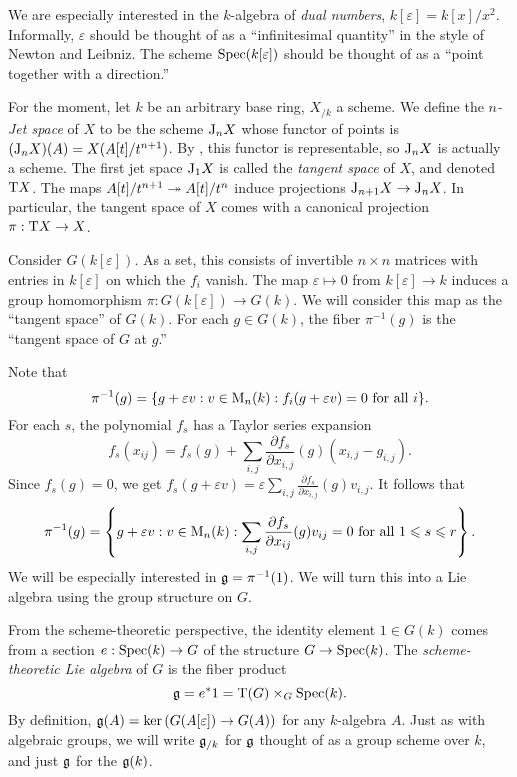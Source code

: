 We are especially interested in the $k$-algebra of \emph{dual numbers}, 
$k[\varepsilon]=k[x]/x^2$. Informally, $\varepsilon$ should be thought of as a 
``infinitesimal quantity'' in the style of Newton and Leibniz. The scheme 
$\operatorname{Spec}(k[\varepsilon])$ should be thought of as a ``point together with 
a direction.'' 

\begin{hard}
For the moment, let $k$ be an arbitrary base ring, $X_{/k}$ a scheme. We define 
the \emph{$n$-Jet space} of $X$ to be the scheme $\mathrm{J}_n X$ whose functor of 
points is $(\mathrm{J}_n X)(A) = X(A[t]/t^{n+1})$. By \cite{vojta-2007}, this 
functor is representable, so $\mathrm{J}_n X$ is actually a scheme. The first jet 
space $\mathrm{J}_1 X$ is called the \emph{tangent space} of $X$, and denoted 
$\mathrm{T} X$. The maps $A[t]/t^{n+1}\twoheadrightarrow A[t]/t^n$ induce projections 
$\mathrm{J}_{n+1} X\to \mathrm{J}_n X$. In particular, the tangent space of $X$ comes with 
a canonical projection $\pi:\mathrm{T} X\to X$. 
\end{hard}

Consider $G(k[\varepsilon])$. As a set, this consists of invertible $n\times n$ 
matrices with entries in $k[\varepsilon]$ on which the $f_i$ vanish. The map 
$\varepsilon\mapsto 0$ from $k[\varepsilon]\to k$ induces a group homomorphism 
$\pi:G(k[\varepsilon])\to G(k)$. We will consider this map as the ``tangent 
space'' of $G(k)$. For each $g\in G(k)$, the fiber 
$\pi^{-1}(g)$ is the ``tangent space of $G$ at $g$.'' 

Note that 
\[
  \pi^{-1}(g) = \{g+\varepsilon v:v\in \operatorname{M}_n(k):f_i(g+\varepsilon v)=0\text{ for all }i\} .
\]
For each $s$, the polynomial $f_s$ has a Taylor series expansion 
\[
  f_s(x_{i j}) = f_s(g) + \sum_{i,j} \frac{\partial f_s}{\partial x_{i,j}}(g) (x_{i,j}-g_{i,j}) .
\]
Since $f_s(g)=0$, we get 
$f_s(g+\varepsilon v) = \varepsilon \sum_{i,j} \frac{\partial f_s}{\partial x_{i,j}}(g) v_{i,j}$. 
It follows that 
\[
  \pi^{-1}(g) = \left\{g+\varepsilon v:v\in \operatorname{M}_n(k):\sum_{i,j} \frac{\partial f_s}{\partial x_{i j}}(g) v_{i j}=0\text{ for all }1\leqslant s\leqslant r\right\} .
\]
We will be especially interested in $\mathfrak{g}=\pi^{-1}(1)$. We will turn this into a 
Lie algebra using the group structure on $G$. 

\begin{hard}
From the scheme-theoretic perspective, the identity element $1\in G(k)$ comes 
from a section $e:\operatorname{Spec}(k)\to G$ of the structure $G\to \operatorname{Spec}(k)$. The 
\emph{scheme-theoretic Lie algebra} of $G$ is the fiber product 
\[
  \mathfrak{g} = e^\ast 1 = \mathrm{T}(G)\times_G \operatorname{Spec}(k) .
\]
By definition, $\mathfrak{g}(A)=\ker\left(G(A[\varepsilon])\to G(A)\right)$ for any 
$k$-algebra $A$. Just as with algebraic groups, we will write $\mathfrak{g}_{/k}$ for 
$\mathfrak{g}$ thought of as a group scheme 
over $k$, and just $\mathfrak{g}$ for the $\mathfrak{g}(k)$. 
\end{hard}





